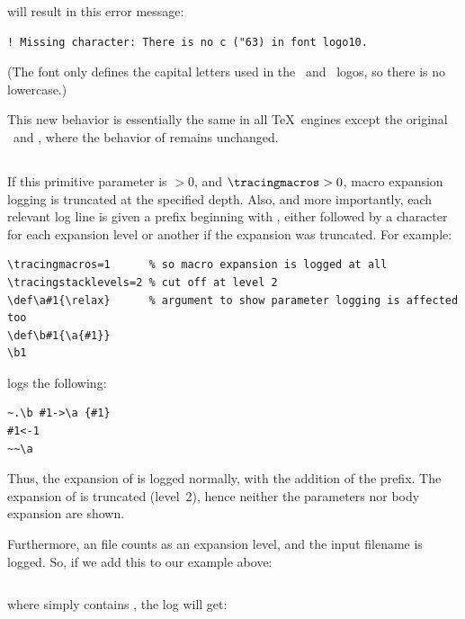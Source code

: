 \documentclass{pdftexmanual}
\begin{document}
\noindent will result in this error message:

\begin{verbatim}
! Missing character: There is no c ("63) in font logo10.
\end{verbatim}

\noindent (The  font only defines the capital letters used
in the \METAFONT\ and \METAPOST\ logos, so there is no lowercase.)

This new behavior is essentially the same in all \TeX\ engines except
the original \TEX\ and \eTeX, where the behavior of
 remains unchanged.


\subsection{}

If this primitive parameter is $>0$, and $\mbox{\tt \textbackslash tracingmacros}>0$, macro
expansion logging is truncated at the specified depth. Also, and more
importantly, each relevant log line is given a prefix beginning with
\type{~}, either followed by a  character for each expansion
level or another \type{~} if the expansion was truncated. For example:

\begin{verbatim}
\tracingmacros=1      % so macro expansion is logged at all
\tracingstacklevels=2 % cut off at level 2
\def\a#1{\relax}      % argument to show parameter logging is affected too
\def\b#1{\a{#1}}
\b1
\end{verbatim}

\noindent logs the following:

\begin{verbatim}
~.\b #1->\a {#1}
#1<-1
~~\a 
\end{verbatim}

Thus, the expansion of  is logged normally, with the addition
of the  prefix. The expansion of  is truncated
(level~2), hence neither the parameters nor body expansion are shown.

Furthermore, an  file counts as an expansion level, and the
input filename is logged. So, if we add this to our example above:
\begin{verbatim}

\end{verbatim}

\noindent where  simply contains , the log
will get:
\end{document}
